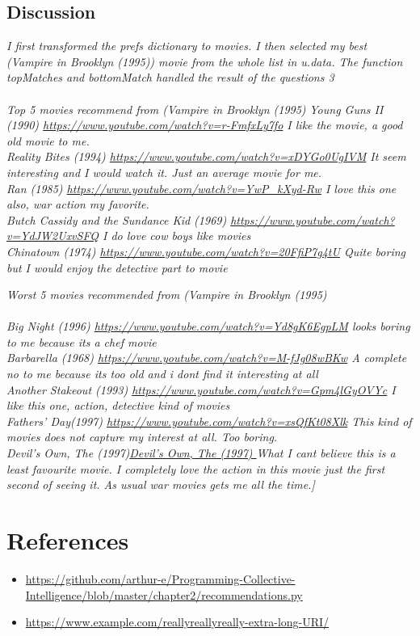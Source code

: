 \documentclass[12pt]{article}
\begin{document}
\subsection*{Discussion}
\emph{ I first transformed the prefs dictionary to movies. I then selected my best (Vampire in Brooklyn (1995)) movie from the whole list in u.data. The function topMatches and bottomMatch handled the result of the questions 3 \\ \\Top 5 movies recommend from (Vampire in Brooklyn (1995) }
\emph{Young Guns II (1990) \url{https://www.youtube.com/watch?v=r-FmfxLy7fo} I like the movie, a good old movie to me.\\ Reality Bites (1994)  \url{https://www.youtube.com/watch?v=xDYGo0UgIVM} It seem interesting and I would watch it. Just an average movie for me.\\ Ran (1985) \url{https://www.youtube.com/watch?v=YwP_kXyd-Rw} I love this one also, war action my favorite.  \\ Butch Cassidy and the Sundance Kid (1969) \url{https://www.youtube.com/watch?v=YdJW2UxvSFQ} I  do love cow boys like movies\\Chinatown (1974) \url{https://www.youtube.com/watch?v=20FfiP7g4tU} Quite boring but I would enjoy the detective part to movie }

\emph{Worst 5 movies recommended from (Vampire in Brooklyn (1995) \\ \\Big Night (1996) \url{https://www.youtube.com/watch?v=Yd8gK6EgpLM} looks boring to me because its a chef movie\\ Barbarella (1968) \url{https://www.youtube.com/watch?v=M-fJg08wBKw} A complete no to me because its too old and i dont find it interesting at all\\Another Stakeout (1993) \url{https://www.youtube.com/watch?v=Gpm4lGyOVYc} I like this one, action, detective kind of movies\\Fathers’ Day(1997) \url{https://www.youtube.com/watch?v=xsQfKt08Xlk} This kind of movies does not capture my interest at all. Too boring.\\ Devil’s Own, The (1997)\url{Devil’s Own, The (1997) } What I cant believe this is a least favourite movie. I completely love the action in this movie just the first second of seeing it. As usual war movies gets me all the time.]}

\section*{References}
\begin{itemize}
    \item {\url{https://github.com/arthur-e/Programming-Collective-Intelligence/blob/master/chapter2/recommendations.py}}
     \item {\url{https://www.example.com/reallyreallyreally-extra-long-URI/}}
\end{itemize}
\end{document}
